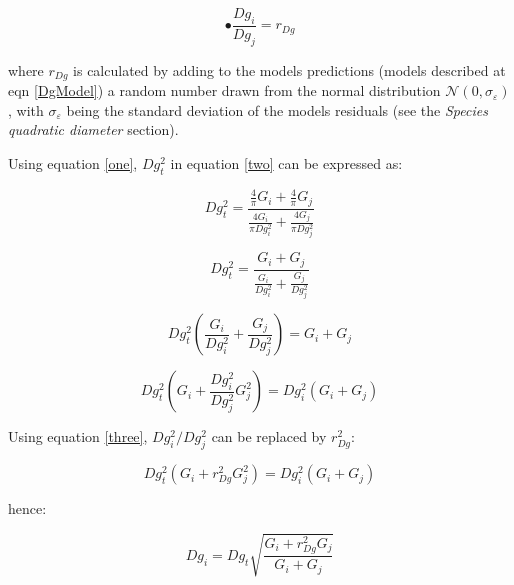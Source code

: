 \documentclass[a4paper]{article}
\begin{document}
\begin{equation}\label{three}\tag{c}
  \bullet \frac{Dg_i}{Dg_j} = r_{Dg}
\end{equation}

\noindent where $r_{Dg}$ is calculated by adding to the models predictions (models described at eqn \ref{DgModel}) a random number drawn from the normal distribution $\mathcal{N} (0, \sigma_\varepsilon)$, with $\sigma_\varepsilon$ being the standard deviation of the models residuals (see the \textit{Species quadratic diameter} section).

\hfill

\noindent Using equation \ref{one}, $Dg_t^2$ in equation \ref{two} can be expressed as:

\begin{equation*}\label{}
  Dg_t^2 = \frac{\frac{4}{\pi}G_i + \frac{4}{\pi}G_j}{\frac{4G_i}{\pi Dg_i^2} + \frac{4G_j}{\pi Dg_j^2}}
\end{equation*}

\begin{equation*}\label{}
  Dg_t^2 = \frac{G_i + G_j} {\frac{G_i}{Dg_i^2} + \frac{G_j}{Dg_j^2}}
\end{equation*}

\begin{equation*}\label{}
  Dg_t^2(\frac{G_i}{Dg_i^2} + \frac{G_j}{Dg_j^2})= G_i + G_j
\end{equation*}

\begin{equation*}\label{}
  Dg_t^2(G_i + \frac{Dg_i^2}{Dg_j^2}G_j^2)= Dg_i^2(G_i + G_j)
\end{equation*}

\noindent Using equation \ref{three}, $Dg_i^2 / Dg_j^2$ can be replaced by $r_{Dg}^2$:

\begin{equation*}\label{}
  Dg_t^2(G_i + r_{Dg}^2G_j^2)= Dg_i^2(G_i + G_j)
\end{equation*}

\noindent hence:

\begin{equation*}\label{}
  Dg_i = Dg_t\sqrt{\frac{G_i + r_{Dg}^2G_j}{G_i + G_j}}
\end{equation*}
\end{document}
